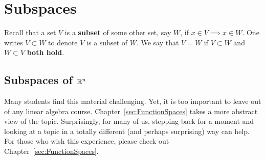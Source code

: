  
   
  \section{Subspaces}
  \label{sec:SubspacesLines}
  
  Recall that a set $V$ is a \textbf{subset} of some other set, say $W$, if $x\in V \implies x \in W$. One writes $V \subset W$ to denote $V$ is a subset of $W$. We say that $V=W$ if $V \subset W$ and $W \subset V$ \textbf{both hold}. \\
  

\subsection{Subspaces of $\mathbb R^n$}


  Many students find this material challenging. Yet, it is too important to leave out of any linear algebra course. Chapter~\ref{sec:FunctionSpaces} takes a more abstract view of the topic. Surprisingly, for many of us, stepping back for a moment and looking at a topic in a totally different (and perhaps surprising) way can help. For those who wish this experience, please check out Chapter~\ref{sec:FunctionSpaces}.

